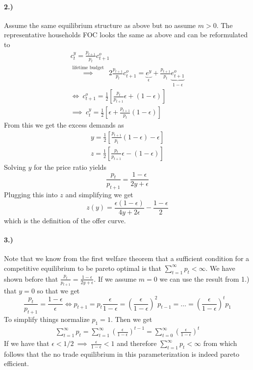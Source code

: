 \paragraph{2.)}
Assume the same equilibrium structure as above but no assume $m > 0$. The
representative households FOC looks the same as above and can be reformulated
to
\begin{align*}
  c_t^y = \frac{p_{t+1}}{p_t} c_{t+1}^o \\
  \overset{\text{lifetime budget}}{\implies} ~~ 2 \frac{p_{t+1}}{p_t} c_{t+1}^o =
  \underbrace{e^y}_{\epsilon} + \frac{p_{t+1}}{p_t} \underbrace{e_{t+1}^o}_{1 -
  \epsilon} \\
  \iff ~ c_{t+1}^o = \frac{1}{2} \left[\frac{p_t}{p_{t+1}} \epsilon + \left(1 -
  \epsilon\right) \right] \\
  \implies ~ c_t^y = \frac{1}{2} \left[\epsilon + \frac{p_{t+1}}{p_t} (1 - \epsilon)\right]
\end{align*}
From this we get the excess demands as
\begin{align*}
  y = \frac{1}{2} \left[\frac{p_{t+1}}{p_t} (1 - \epsilon) - \epsilon \right]
  \\
  z = \frac{1}{2} \left[\frac{p_t}{p_{t+1}} \epsilon - (1 - \epsilon) \right]
\end{align*}
Solving $y$ for the price ratio yields
\begin{equation*}
  \frac{p_t}{p_{t+1}} = \frac{1 - \epsilon}{2 y + \epsilon}
\end{equation*}
Plugging this into $z$ and simplifying we get
\begin{equation*}
  z(y) = \frac{\epsilon (1 - \epsilon)}{4 y + 2 \epsilon} - \frac{1 - \epsilon}{2}
\end{equation*}
which is the definition of the offer curve.

\paragraph{3.)}
Note that we know from the first welfare theorem that a sufficient condition
for a competitive equilibrium to be pareto optimal is that
$\sum_{t=1}^{\infty} p_t < \infty$. We have shown before that
$\frac{p_t}{p_{t+1}} = \frac{1 - \epsilon}{2 y + \epsilon}$. If we assume $m =
0$ we can use the result from 1.) that $y = 0$ so that we get
\begin{equation*}
  \frac{p_t}{p_{t+1}} = \frac{1 - \epsilon}{\epsilon} \iff p_{t+1} = p_t
  \frac{\epsilon}{1 - \epsilon} = \left(\frac{\epsilon}{1 - \epsilon} \right)^2
  p_{t-1} = \dots = \left(\frac{\epsilon}{1 - \epsilon}\right)^t p_1
\end{equation*}
To simplify things normalize $p_1 = 1$. Then we get
\begin{align*}
  \sum_{t=1}^\infty p_t = \sum_{t=1}^\infty \left(\frac{\epsilon}{1 -
  \epsilon}\right)^{t-1} = \sum_{t=0}^\infty \left(\frac{\epsilon}{1 - \epsilon}\right)^t
\end{align*}
If we have that $\epsilon < 1/2~\implies~\frac{\epsilon}{1 - \epsilon} < 1$ and
therefore $\sum_{t=1}^\infty p_t < \infty $ from which follows that the no
trade equilibrium in this parameterization is indeed pareto efficient.

